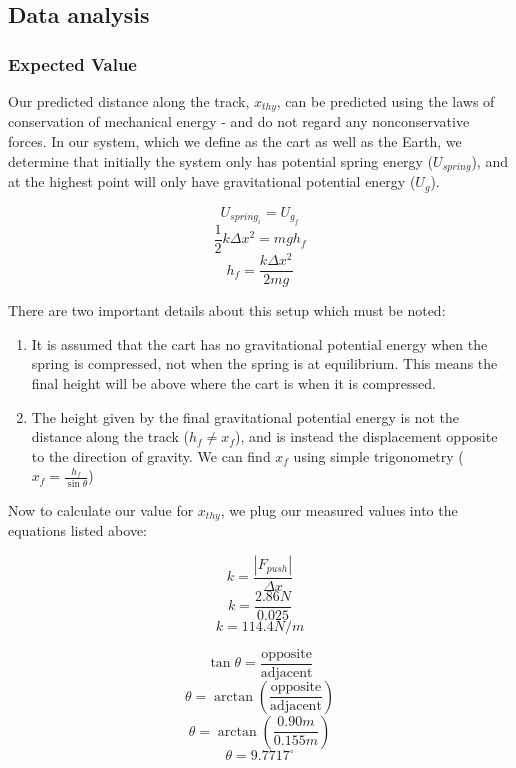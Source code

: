 \documentclass[11pt, letterpaper, includehead]{article}
\begin{document}
\subsection{Data analysis}
\subsubsection{Expected Value}
Our predicted distance along the track, $x_{thy}$, can be predicted using
the laws of conservation of mechanical energy - and do not regard any nonconservative
forces. In our system, which we define as the cart as well as the Earth, we determine
that initially the system only has potential spring energy ($U_{spring}$), and at the highest
point will only have gravitational potential energy ($U_g$). 


$$U_{spring_i} = U_{g_f}$$
$$\frac{1}{2}k\Delta x^2 = mgh_f$$
$$h_f = \frac{k\Delta x^2}{2mg}$$

There are two important details about this setup which must be noted:\\
\begin{enumerate}
  \item It is assumed that the cart has no gravitational potential energy
        when the spring is compressed, not when the spring is at equilibrium.
        This means the final height will be above where the cart is when it is compressed.
  \item The height given by the final gravitational potential energy is not
        the distance along the track ($h_f \ne x_f$), and is instead the 
        displacement opposite to the direction of gravity. We can find $x_f$ using simple trigonometry
        ($x_f = \frac{h_f}{\sin\theta}$)  
\end{enumerate}

Now to calculate our value for $x_{thy}$, we plug our measured values
into the equations listed above:

\begin{multicols}{2}
  $$k = \frac{|{F}_{push}|}{\Delta x}$$
  $$k = \frac{2.86N}{0.025}$$
  $$k = 114.4N/m$$

  \columnbreak

  $$\tan\theta = \frac{\text{opposite}}{\text{adjacent}}$$
  $$\theta = \arctan\left(\frac{\text{opposite}}{\text{adjacent}}\right)$$
  $$\theta = \arctan\left(\frac{0.90m}{0.155m}\right)$$
  $$\theta = 9.7717^{\circ}$$

\end{multicols}
\end{document}

